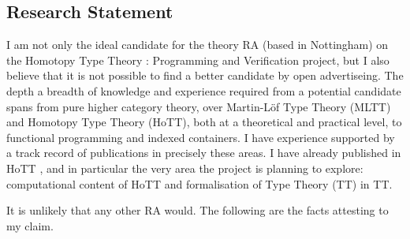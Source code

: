 \documentclass[a4paper]{article}
\newcommand{\project}{Homotopy Type Theory : Programming and Verification}
\newcommand{\mltt}{MLTT}
\begin{document}
\subsection*{Research Statement}
I am not only the ideal candidate for the theory RA (based in
Nottingham) on the {\project} project, but I also believe that it is
not possible to find a better candidate by open advertiseing.  The
depth a breadth of knowledge and experience required from a potential
candidate spans from pure higher category theory, over Martin-L\"of
Type Theory ({\mltt}) and Homotopy Type Theory (HoTT), both at a
theoretical and practical level, to functional programming and indexed
containers. I have experience supported by a track record of
publications in precisely these areas. I have already published in
HoTT , and in
particular the very area the project is planning to explore:
computational content of HoTT and formalisation of Type Theory (TT) in
TT. 



It is unlikely that any other RA would.  The following are the facts
attesting to my claim.


\end{document}
